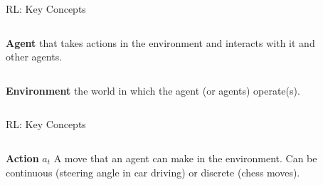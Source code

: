 \documentclass[aspectratio=169,xcolor=dvipsnames,svgnames,x11names,fleqn]{beamer}
\begin{document}
\begin{frame}{RL: Key Concepts}

\begin{columns}[c] %

    
    \begin{tblock}{\textbf{Agent}}
    that takes actions in the environment and interacts with it and other agents.

    \end{tblock}

    {\Huge\faAndroid~~\faMale~~\faUsers~~\faCar }

    \end{columns}

        \begin{columns}[c] %

    
    \begin{peach}{\textbf{Environment}}
the world in which the agent (or agents) operate(s).

    \end{peach}

    {\Huge\faGlobe}

        \end{columns}
        
\end{frame}



\begin{frame}{RL: Key Concepts}

\begin{columns}[c] %

    
    \begin{tblock}{\textbf{Action} $a_t$}
A move that an agent can make in the environment. Can be continuous (steering angle in car driving) or discrete (chess moves).
    \end{tblock}

    {\Huge \faArrowDown~~\faArrowUp~~\faArrowLeft~~\faArrowRight }

    \end{columns}

\end{frame}
\end{document}
